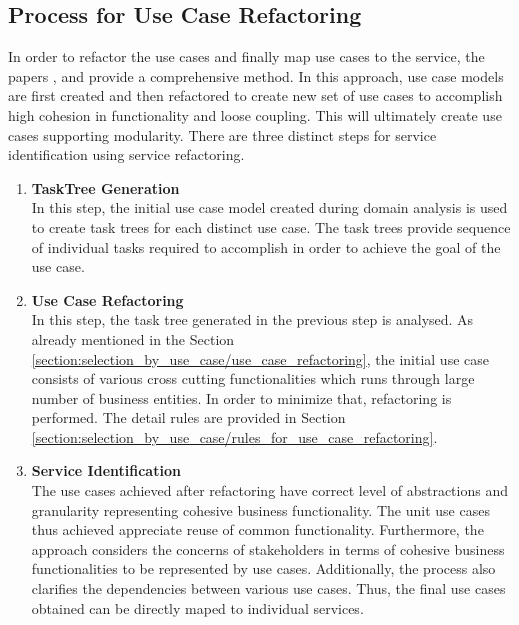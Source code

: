 \subsection{Process for Use Case Refactoring}\label{section:selection_by_use_case/process_for_use_case_refactoring}
In order to refactor the use cases and finally map use cases to the service, the papers \cite{Kim:2006aa}, \cite{Yun:2006aa} and \cite{Doh:2007aa} provide a comprehensive method. In this approach, use case models are first created and then refactored to create new set of use cases to accomplish high cohesion in functionality and loose coupling. This will ultimately create use cases supporting modularity. \cite{Fareghzadeh:2008aa} There are three distinct steps for service identification using service refactoring.
\begin{enumerate}
\item \textbf{TaskTree Generation}\\
In this step, the initial use case model created during domain analysis is used to create task trees for each distinct use case. The task trees provide sequence of individual tasks required to accomplish in order to achieve the goal of the use case.
\\
\item \textbf{Use Case Refactoring}\\
In this step, the task tree generated in the previous step is analysed. As already mentioned in the Section \ref{section:selection_by_use_case/use_case_refactoring}, the initial use case consists of various cross cutting functionalities which runs through large number of business entities. In order to minimize that, refactoring is performed. The detail rules are provided in Section \ref{section:selection_by_use_case/rules_for_use_case_refactoring}.
\\
\item \textbf{Service Identification}\\
The use cases achieved after refactoring have correct level of abstractions and granularity representing cohesive business functionality. The unit use cases thus achieved appreciate reuse of common functionality.  \cite{Doh:2007aa} Furthermore, the approach considers the concerns of stakeholders in terms of cohesive business functionalities to be represented by use cases.\cite{Fareghzadeh:2008aa} Additionally, the process also clarifies the dependencies between various use cases. Thus, the final use cases obtained can be directly maped to individual services.
\end{enumerate}
\\
